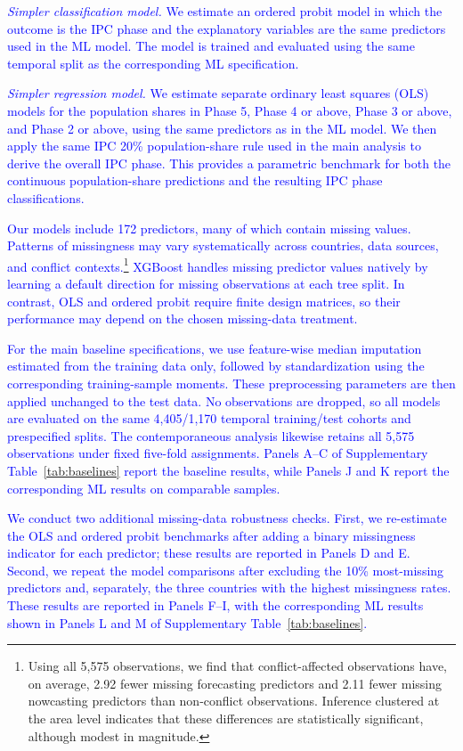 \documentclass[pdflatex,sn-mathphys-num]{sn-jnl}%
\theoremstyle{thmstyleone}%
\theoremstyle{thmstyletwo}%
\theoremstyle{thmstylethree}%
\begin{document}
\textcolor{blue}{\textit{Simpler classification model.} We estimate an ordered probit model in which the outcome is the IPC phase and the explanatory variables are the same predictors used in the ML model. The model is trained and evaluated using the same temporal split as the corresponding ML specification.}

\textcolor{blue}{\textit{Simpler regression model.} We estimate separate ordinary least squares (OLS) models for the population shares in Phase 5, Phase 4 or above, Phase 3 or above, and Phase 2 or above, using the same predictors as in the ML model. We then apply the same IPC 20\% population-share rule used in the main analysis to derive the overall IPC phase. This provides a parametric benchmark for both the continuous population-share predictions and the resulting IPC phase classifications.}

\textcolor{blue}{Our models include 172 predictors, many of which contain missing values. Patterns of missingness may vary systematically across countries, data sources, and conflict contexts.\footnote{Using all 5,575 observations, we find that conflict-affected observations have, on average, 2.92 fewer missing forecasting predictors and 2.11 fewer missing nowcasting predictors than non-conflict observations. Inference clustered at the area level indicates that these differences are statistically significant, although modest in magnitude.} XGBoost handles missing predictor values natively by learning a default direction for missing observations at each tree split. In contrast, OLS and ordered probit require finite design matrices, so their performance may depend on the chosen missing-data treatment.}

\textcolor{blue}{For the main baseline specifications, we use feature-wise median imputation estimated from the training data only, followed by standardization using the corresponding training-sample moments. These preprocessing parameters are then applied unchanged to the test data. No observations are dropped, so all models are evaluated on the same 4,405/1,170 temporal training/test cohorts and prespecified splits. The contemporaneous analysis likewise retains all 5,575 observations under fixed five-fold assignments. Panels A--C of Supplementary Table~\ref{tab:baselines} report the baseline results, while Panels J and K report the corresponding ML results on comparable samples.}

\textcolor{blue}{We conduct two additional missing-data robustness checks. First, we re-estimate the OLS and ordered probit benchmarks after adding a binary missingness indicator for each predictor; these results are reported in Panels D and E. Second, we repeat the model comparisons after excluding the 10\% most-missing predictors and, separately, the three countries with the highest missingness rates. These results are reported in Panels F--I, with the corresponding ML results shown in Panels L and M of Supplementary Table~\ref{tab:baselines}.}
\end{document}
